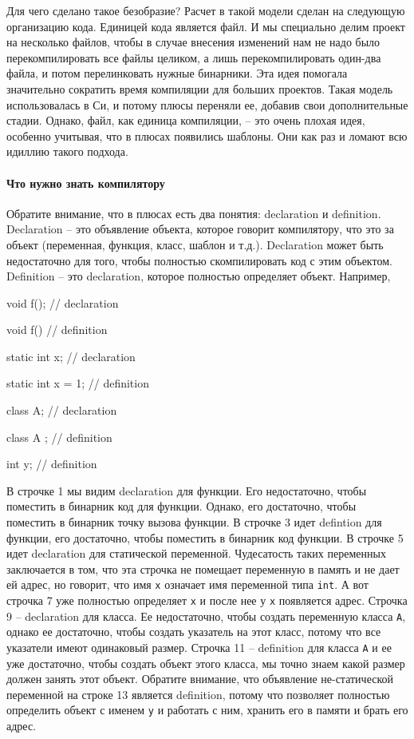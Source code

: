 Для чего сделано такое безобразие?
Расчет в такой модели сделан на следующую организацию кода.
Единицей кода является файл.
И мы специально делим проект на несколько файлов, чтобы в случае внесения изменений нам не надо было перекомпилировать все файлы целиком, а лишь перекомпилировать один-два файла, и потом перелинковать нужные бинарники.
Эта идея помогала значительно сократить время компиляции для больших проектов.
Такая модель использовалась в Си, и потому плюсы переняли ее, добавив свои дополнительные стадии.
Однако, файл, как единица компиляции, -- это очень плохая идея, особенно учитывая, что в плюсах появились шаблоны.
Они как раз и ломают всю идиллию такого подхода.

\paragraph{Что нужно знать компилятору}

Обратите внимание, что в плюсах есть два понятия: declaration и definition.
Declaration -- это объявление объекта, которое говорит компилятору, что это за объект (переменная, функция, класс, шаблон и т.д.).
Declaration может быть недостаточно для того, чтобы полностью скомпилировать код с этим объектом.
Definition -- это declaration, которое полностью определяет объект.
Например,
\begin{cppcode}
void f(); // declaration

void f() {} // definition

static int x; // declaration

static int x = 1; // definition

class A; // declaration

class A {}; // definition

int y; // definition
\end{cppcode}
В строчке 1 мы видим declaration для функции.
Его недостаточно, чтобы поместить в бинарник код для функции.
Однако, его достаточно, чтобы поместить в бинарник точку вызова функции.
В строчке 3 идет defintion для функции, его достаточно, чтобы поместить в бинарник код функции.
В строчке 5 идет declaration для статической переменной.
Чудесатость таких переменных заключается в том, что эта строчка не помещает переменную в память и не дает ей адрес, но говорит, что имя \verb"x" означает имя переменной типа \verb"int".
А вот строчка 7 уже полностью определяет \verb"x" и после нее у \verb"x" появляется адрес.
Строчка 9 -- declaration для класса.
Ее недостаточно, чтобы создать переменную класса \verb"A", однако ее достаточно, чтобы создать указатель на этот класс, потому что все указатели имеют одинаковый размер.
Строчка 11 -- definition для класса \verb"A" и ее уже достаточно, чтобы создать объект этого класса, мы точно знаем какой размер должен занять этот объект.
Обратите внимание, что объявление не-статической переменной на строке 13 является definition, потому что позволяет полностью определить объект с именем \verb"y" и работать с ним, хранить его в памяти и брать его адрес.


